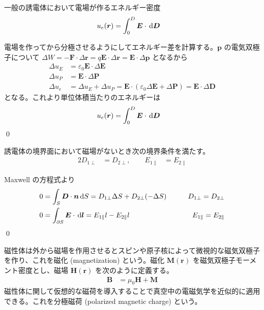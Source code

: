 \documentclass[uplatex,dvipdfmx,a4paper,11pt]{jlreq}
\makeatletter
\newcommand{\EE}{\bm{E}}
\newcommand{\BB}{\bm{B}}
\newcommand{\DD}{\bm{D}}
\newcommand{\HH}{\bm{H}}
\newcommand{\PP}{\bm{P}}
\newcommand{\MM}{\bm{M}}
\newcommand{\rr}{\bm{r}}
\newcommand{\pp}{\bm{p}}
\numberwithin{equation}{section}
\theoremstyle{definition}
\renewenvironment{proof}[1][\proofname]{\par
  \normalfont
  \topsep6\p@\@plus6\p@ \trivlist
  \item[\hskip\labelsep{\bfseries #1}\@addpunct{\bfseries}]\ignorespaces\quad\par
}{%
  \qed\endtrivlist\@endpefalse
}
\renewcommand\proofname{証明}
\makeatother
\begin{document}
\begin{theorem}[誘電体のエネルギー]
  一般の誘電体において電場が作るエネルギー密度
  \begin{align}
    u_e(\rr) & = \int_0^D\EE\cdot\dl{\DD}
  \end{align}
\end{theorem}
\begin{proof}
  電場を作ってから分極させるようにしてエネルギー差を計算する。$\pp$ の電気双極子について $\Delta W = -\bm{F}\cdot\Delta\rr = q\EE\cdot\Delta\rr = \EE\cdot\Delta\pp$ となるから
  \begin{align}
    \Delta u_E & = \varepsilon_0\EE\cdot\Delta\EE                                                             \\
    \Delta u_P & = \EE\cdot\Delta\PP                                                                          \\
    \Delta u_e & = \Delta u_E + \Delta u_P = \EE\cdot(\varepsilon_0\Delta\EE + \Delta\PP) = \EE\cdot\Delta\DD
  \end{align}
  となる。これより単位体積当たりのエネルギーは
  \begin{align}
    u_e(\rr) & = \int_0^D\EE\cdot\dl{\DD}
  \end{align}
\end{proof}

\begin{theorem}[境界条件]
  誘電体の境界面において磁場がないとき次の境界条件を満たす。
  \begin{alignat}{2}
    D_{1\perp} & = D_{2\perp}, \qquad E_{1\parallel} & = E_{2\parallel}
  \end{alignat}
\end{theorem}
\begin{proof}
  Maxwell の方程式より
  \begin{alignat}{2}
    0 & = \int_S\DD\cdot\bm{n}\dl{S} = D_{1\perp}\Delta S + D_{2\perp}(-\Delta S)  \qquad & D_{1\perp} = D_{2\perp}         \\
    0 & = \int_{\partial S}\EE\cdot\dl{\bm{l}} = E_{1\parallel}l - E_{2\parallel}l \qquad & E_{1\parallel} = E_{2\parallel}
  \end{alignat}
\end{proof}

\begin{definition}[磁性体]
  磁性体は外から磁場を作用させるとスピンや原子核によって微視的な磁気双極子を作り、これを磁化 (magnetization) という。磁化 $\MM(\rr)$ を磁気双極子モーメント密度とし、磁場 $\HH(\rr)$ を次のように定義する。
  \begin{align}
    \BB & = \mu_0\HH + \MM
  \end{align}
  磁性体に関して仮想的な磁荷を導入することで真空中の電磁気学を近似的に適用できる。これを分極磁荷 (polarized magnetic charge) という。
\end{definition}
\end{document}
